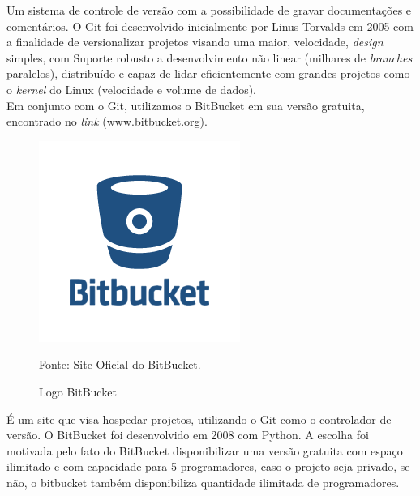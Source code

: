 Um sistema de controle de versão com a possibilidade de gravar documentações e comentários. O Git foi desenvolvido inicialmente por Linus Torvalds em 2005 com a finalidade de versionalizar projetos visando uma maior, velocidade, {\it design} simples, com Suporte robusto a desenvolvimento não linear (milhares de {\it branches} paralelos), distribuído e capaz de lidar eficientemente com grandes projetos como o {\it kernel} do Linux (velocidade e volume de dados).
\\
\indent 
Em conjunto com o Git, utilizamos o BitBucket em sua versão gratuita, encontrado no {\it link} (www.bitbucket.org).

\begin{figure}[!htb]
	\centering
	\includegraphics[scale=0.50
	]{imagens/bitbucket-logo}
	\caption{Logo BitBucket}
	Fonte: Site Oficial do BitBucket.
	\label{Rotulo}
\end{figure}

 É um site que visa hospedar projetos, utilizando o Git como o controlador de versão. O BitBucket foi desenvolvido em 2008 com Python. A escolha foi motivada pelo fato do BitBucket disponibilizar uma versão gratuita com espaço ilimitado e com capacidade para 5 programadores, caso o projeto seja privado, se não, o bitbucket também disponibiliza quantidade ilimitada de programadores.


